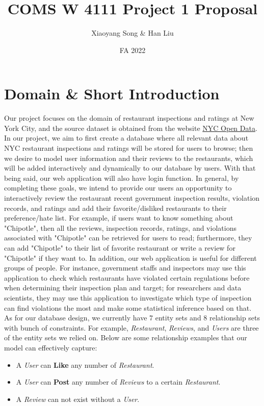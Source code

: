 \documentclass[a4paper,12pt]{article}
\title{COMS W 4111 Project 1 Proposal}
\author{Xiaoyang Song  \&  Han Liu}
\date{FA 2022}
\theoremstyle{definition}
\begin{document}
\maketitle
\section{Domain \& Short Introduction}
Our project focuses on the domain of restaurant inspections and ratings at New York City, and the source dataset is obtained from the website \href{https://data.cityofnewyork.us/Health/DOHMH-New-York-City-Restaurant-Inspection-Results/43nn-pn8j}{NYC Open Data}. In our project, we aim to first create a database where all relevant data about NYC restaurant inspections and ratings will be stored for users to browse; then we desire to model user information and their reviews to the restaurants, which will be added interactively and dynamically to our database by users. With that being said, our web application will also have login function. In general, by completing these goals, we intend to provide our users an opportunity to interactively review the restaurant recent government inspection results, violation records, and ratings and add their favorite/disliked restaurants to their preference/hate list. For example, if users want to know something about "Chipotle", then all the reviews, inspection records, ratings, and violations associated with "Chipotle" can be retrieved for users to read; furthermore, they can add "Chipotle" to their list of favorite restaurant or write a review for "Chipotle" if they want to. In addition, our web application is useful for different groups of people. For instance, government staffs and inspectors may use this application to check which restaurants have violated certain regulations before when determining their inspection plan and target; for researchers and data scientists, they may use this application to investigate which type of inspection can find violations the most and make some statistical inference based on that. As for our database design, we currently have 7 entity sets and 8 relationship sets with bunch of constraints. For example, \textit{Restaurant}, \textit{Reviews}, and \textit{Users} are three of the entity sets we relied on. Below are some relationship examples that our model can effectively capture:
\vspace{-0.4cm}
\begin{itemize}
    \item A \textit{User} can \textbf{Like} any number of \textit{Restaurant}.
    \vspace{-0.2cm}
    \item A \textit{User} can \textbf{Post} any number of \textit{Reviews} to a certain \textit{Restaurant}. 
    \vspace{-0.2cm}
    \item A \textit{Review} can not exist without a \textit{User}.
\end{itemize}
\end{document}
